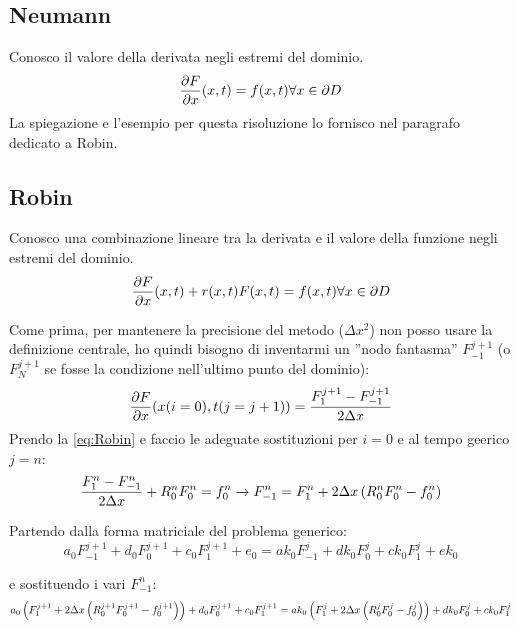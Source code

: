 \subsection{Neumann}
Conosco il valore della derivata negli estremi del dominio.
\begin{equation}
\frac{\partial F}{\partial x}(x,t) = f(x,t) \forall x \in \partial D
\end{equation}
La spiegazione e l'esempio per questa risoluzione lo fornisco nel paragrafo dedicato a Robin.

\subsection{Robin}
Conosco una combinazione lineare tra la derivata e il valore della funzione negli estremi del dominio.
\begin{equation}\label{eq:Robin}
\frac{\partial F}{\partial x}(x,t) +r(x,t) F(x,t) = f(x,t) \forall x \in \partial D
\end{equation}

Come prima, per mantenere la precisione del metodo ($\Delta x^2$) non posso usare la definizione  centrale,  ho quindi bisogno di inventarmi un ''nodo fantasma'' $F_{-1}^{j+1}$ (o $F_{N}^{j+1}$ se fosse la condizione nell'ultimo punto del dominio):
\begin{equation}
\frac{\partial F}{\partial x}(x(i=0),t(j=j+1)) = \frac{F_{1}^{j+1}-F_{-1}^{j+1}}{2\Delta x}
\end{equation}
Prendo la \eqref{eq:Robin} e faccio le adeguate sostituzioni per $i=0$ e al tempo geerico $j=n$:
\begin{equation}
\frac{F_{1}^{n}-F_{-1}^{n}}{2\Delta x} + R_0^nF_{0}^{n} = f_0^n  \to 
F_{-1}^{n} = F_{1}^{n} + 2\Delta x \left( R_0^nF_{0}^{n}-f^n_0 \right)
\end{equation}

Partendo dalla forma matriciale del problema generico:
\begin{equation}
a_0  F_{-1}^{j+1} + d_0 F_{0}^{j+1} + c_{0}F_{1}^{j+1} + e_0 = 
ak_0 F_{-1}^{j}   + dk_0 F_{0}^{j}  + ck_0 F_{1}^{j} + ek_0
\end{equation}

e sostituendo i vari $F_{-1}^{n}$:
\begin{equation}
a_0 \left(  F_{1}^{j+1} + 2 \Delta x \left( R_0^{j+1}F_{0}^{j+1}-f^{j+1}_0 \right) \right) +d_0 F_{0}^{j+1} +c_{0}F_{1}^{j+1} = 
ak_0 \left( F_{1}^{j} + 2 \Delta x \left( R_0^jF_{0}^{j}-f^{j}_0 \right) \right) + dk_0 F_{0}^{j} + ck_0 F_{1}^{j}
\end{equation}

